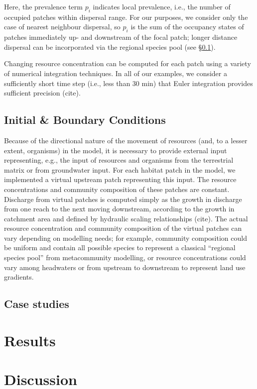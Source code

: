 \documentclass[11pt,a4paper]{article}
\begin{document}
Here, the prevalence term $p_i$ indicates local prevalence, i.e., the number of occupied patches within dispersal range.
For our purposes, we consider only the case of nearest neighbour dispersal, so $p_i$ is the sum of the occupancy states of patches immediately up- and downstream of the focal patch; longer distance dispersal can be incorporated via the regional species pool (see §\ref{ss:initial-boundary}).

Changing resource concentration can be computed for each patch using a variety of numerical integration techniques.
In all of our examples, we consider a sufficiently short time step (i.e., less than 30 min) that Euler integration provides sufficient precision (cite).

\subsection{Initial \& Boundary Conditions} \label{ss:initial-boundary}

Because of the directional nature of the movement of resources (and, to a lesser extent, organisms) in the model, it is necessary to provide external input representing, e.g., the input of resources and organisms from the terrestrial matrix or from groundwater input.
For each habitat patch in the model, we implemented a virtual upstream patch representing this input.
The resource concentrations and community composition of these patches are constant.
Discharge from virtual patches is computed simply as the growth in discharge from one reach to the next moving downstream, according to the growth in catchment area and defined by hydraulic scaling relationships (cite).
The actual resource concentration and community composition of the virtual patches can vary depending on modelling needs; for example, community composition could be uniform and contain all possible species to represent a classical “regional species pool” from metacommunity modelling, or resource concentrations could vary among headwaters or from upstream to downstream to represent land use gradients.


\subsection{Case studies}

\section{Results}

\section{Discussion}

\printbibliography
\end{document}
